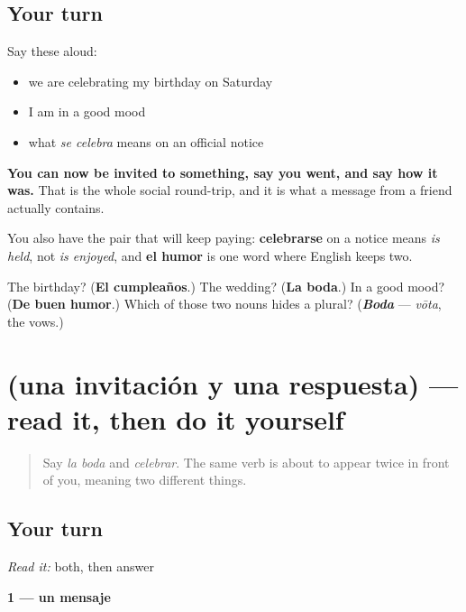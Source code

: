 \subsection*{Your turn}
Say these aloud:

\begin{itemize}
\raggedright
  \item we are celebrating my birthday on Saturday
  \item I am in a good mood
  \item what \emph{se celebra} means on an official notice
\end{itemize}

\begin{grammarlens}[title={What you've built}]
\textbf{You can now be invited to something, say you went, and say how it was.} That is the whole social round-trip, and it is what a message from a friend actually contains.

You also have the pair that will keep paying: \textbf{celebrarse} on a notice means \emph{is held}, not \emph{is enjoyed}, and \textbf{el humor} is one word where English keeps two.
\end{grammarlens}

\begin{tcolorbox}[breakable,colback=teal!4,colframe=teal!35!black,title={Before you move on}]
The birthday? (\textbf{El cumpleaños}.) The wedding? (\textbf{La boda}.) In a good mood? (\textbf{De buen humor}.) Which of those two nouns hides a plural? (\emph{\textbf{Boda}} — \emph{vōta}, the vows.)
\end{tcolorbox}
\section[Practice]{(una invitación y una respuesta) — read it, then do it yourself}

\label{lesson:ES-C440-sintesis-fiesta}



\begin{quote}
Say \emph{la boda} and \emph{celebrar}. The same verb is about to appear twice in front of you, meaning two different things.
\end{quote}

\subsection*{Your turn}
\emph{Read it:} both, then answer

\textbf{1 — un mensaje}

